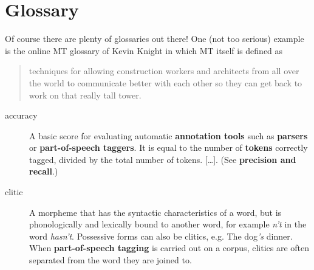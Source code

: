 \newpage
{}
{}
\chapter*{Glossary}

Of course there are plenty of glossaries out there! One (not too serious) example is the online MT glossary of Kevin Knight  in which MT itself is defined as 
\begin{quote}
techniques for allowing construction workers and architects from all over the world to communicate better with each other so they can get back to work on that really tall tower. 
\end{quote}

\begin{description}
 \item[accuracy] A basic score for evaluating automatic \textbf{annotation tools} such as \textbf{parsers} or \textbf{part-of-speech taggers}. It is equal to the number of \textbf{tokens} correctly tagged, divided by the total number of tokens. [\ldots]. (See \textbf{precision and recall}.)

\item[clitic] A morpheme that has the syntactic characteristics of a word, but is phonologically and lexically bound to another word, for example \textit{n't} in the word \textit{hasn't}. Possessive forms can also be clitics, e.g. The dog\textit{'s} dinner. When \textbf{part-of-speech tagging} is carried out on a corpus, clitics are often separated from the word they are joined to.

\end{description}

